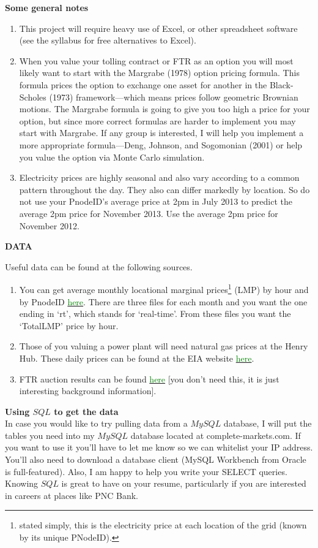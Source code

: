 \documentclass{article}
\begin{document}
\begin{center}
{\bf Some general notes}
\end{center}
\begin{enumerate}
\item This project will require heavy use of Excel, or other spreadsheet software (see the syllabus for free alternatives to Excel).  
\item When you value your tolling contract or FTR as an option you will most likely want to start with the Margrabe (1978) option pricing formula.  This formula prices the option to exchange one asset for another in the Black-Scholes (1973) framework---which means prices follow geometric Brownian motions.  The Margrabe formula is going to give you too high a price for your option, but since more correct formulas are harder to implement you may start with Margrabe.  If any group is interested, I will help you implement a more appropriate formula---Deng, Johnson, and Sogomonian (2001) or help you value the option via Monte Carlo simulation.
\item Electricity prices are highly seasonal and also vary according to a common pattern throughout the day.  They also can differ markedly by location.  So do not use your PnodeID's average price at 2pm in July 2013 to predict the average 2pm price for November 2013.  Use the average 2pm price for November 2012.
\end{enumerate}
\begin{center}
{\bf DATA}
\end{center}
Useful data can be found at the following sources.
\begin{enumerate}
\item You can get average monthly locational marginal prices\footnote{stated simply, this is the electricity price at each location of the grid (known by its unique PNodeID).} (LMP) by hour and by PnodeID \href{http://www.pjm.com/markets-and-operations/energy/real-time/monthlylmp.aspx}{\textcolor{green}{here}}.  There are three files for each month and you want the one ending in `rt', which stands for `real-time'. From these files you want the `TotalLMP' price by hour.
\item  Those of you valuing a power plant will need natural gas prices at the Henry Hub.  These daily prices can be found at the EIA website \href{http://www.eia.gov/dnav/ng/ng_pri_fut_s1_d.htm}{\textcolor{green}{here}}.
\item FTR auction results can be found \href{http://www.pjm.com/markets-and-operations/ftr/auction-user-info/historical-ftr-auction.aspx}{\textcolor{green}{here}} [you don't need this, it is just interesting background information].
\end{enumerate}
{\bf Using $SQL$ to get the data}\\
In case you would like to try pulling data from a $MySQL$ database, I will put the tables you need into my $MySQL$ database located at complete-markets.com.  If you want to use it you'll have to let me know so we can whitelist your IP address.  You'll also need to download a database client (MySQL Workbench from Oracle is full-featured).  Also, I am happy to help you write your SELECT queries.  Knowing $SQL$ is great to have on your resume, particularly if you are interested in careers at places like PNC Bank. 
\end{document}
